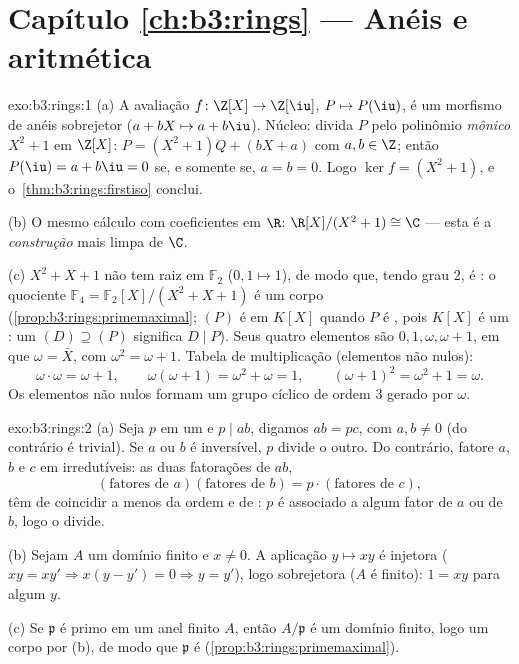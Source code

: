 \section*{Capítulo \ref{ch:b3:rings} --- Anéis e aritmética}

\begin{solution}{exo:b3:rings:1}
(a) A avaliação $f \colon \Z[X] \to \Z[\iu]$, $P \mapsto P(\iu)$, é um morfismo de anéis sobrejetor ($a + bX \mapsto a + b\iu$).
Núcleo: divida $P$ pelo polinômio \emph{mônico} $X^2 + 1$ em $\Z[X]$:
$P = (X^2 +
1)Q + (bX + a)$ com $a, b \in \Z$; então $P(\iu) = a + b\iu = 0$ se, e somente se, $a = b = 0$. Logo $\ker f = (X^2+1)$, e
o~\cref{thm:b3:rings:firstiso} conclui.

(b) O mesmo cálculo com coeficientes em $\R$: $\R[X]/(X^2+1)
\cong \C$ --- esta é a
\emph{construção} mais limpa de $\C$.

(c) $X^2 + X + 1$ não tem raiz em $\mathbb F_2$ ($0, 1 \mapsto 1$), de modo que, tendo grau $2$,
é : o quociente $\mathbb
F_4 = \mathbb F_2[X]/(X^2+X+1)$ é um corpo (\cref{prop:b3:rings:primemaximal}; $(P)$ é
 em $K[X]$ quando $P$ é , pois $K[X]$ é um
: um  $(D) \supseteq
(P)$ significa $D \mid P$). Seus quatro elementos são $0, 1, \omega,
\omega + 1$, em
que $\omega = \bar X$, com $\omega^2 = \omega + 1$. Tabela de multiplicação (elementos não nulos):
\[
\omega \cdot \omega = \omega + 1, \qquad
\omega(\omega + 1) = \omega^2 + \omega = 1, \qquad
(\omega+1)^2 = \omega^2 + 1 = \omega .
\]
Os elementos não nulos formam um grupo cíclico de ordem $3$ gerado
por $\omega$.
\end{solution}

\begin{solution}{exo:b3:rings:2}
(a) Seja $p$  em um  e $p \mid ab$, digamos $ab =
pc$, com $a, b \neq 0$
(do contrário é trivial). Se $a$ ou $b$ é inversível, $p$
divide o outro. Do contrário, fatore $a$, $b$ e $c$ em
irredutíveis: as duas fatorações de $ab$,
\[
(\text{fatores de } a)(\text{fatores de } b) = p \cdot
(\text{fatores de } c),
\]
têm de coincidir a menos da ordem e de : $p$ é associado a
algum fator  de $a$ ou de $b$, logo o divide.

(b) Sejam $A$ um domínio finito e $x \neq 0$. A aplicação $y \mapsto
xy$ é injetora
($xy = xy' \Rightarrow x(y - y') = 0 \Rightarrow
y = y'$), logo sobrejetora ($A$ é finito): $1 = xy$ para algum
$y$.

(c) Se $\mathfrak p$ é primo em um anel finito $A$, então $A/\mathfrak p$ é um domínio
finito, logo um corpo por (b), de modo que $\mathfrak p$ é 
(\cref{prop:b3:rings:primemaximal}).
\end{solution}

